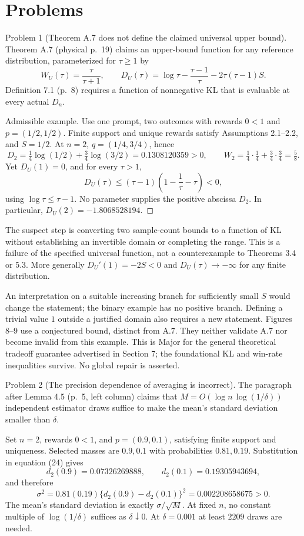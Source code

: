 \documentclass[10pt]{article}
\begin{document}
\section*{Problems}
Problem 1 (Theorem A.7 does not define the claimed universal upper bound).  Theorem A.7 (physical p. 19) claims an upper-bound function for any reference distribution, parameterized for \(\tau\ge1\) by \[W_U(\tau)=\frac{\tau}{\tau+1},\qquad
 D_U(\tau)=\log\tau-\frac{\tau-1}{\tau}-2\tau(\tau-1)S.\] Definition 7.1 (p. 8) requires a function of nonnegative KL that is evaluable at every actual \(D_n\).\par
Admissible example. Use one prompt, two outcomes with rewards \(0<1\) and \(p=(1/2,1/2)\). Finite support and unique rewards satisfy Assumptions 2.1–2.2, and \(S=1/2\). At \(n=2\), \(q=(1/4,3/4)\), hence \[D_2=\tfrac14\log(1/2)+\tfrac34\log(3/2)=0.1308120359>0,\qquad
 W_2=\tfrac14\cdot\tfrac14+\tfrac34\cdot\tfrac34=\tfrac58.\] Yet \(D_U(1)=0\), and for every \(\tau>1\), \[D_U(\tau)\le(\tau-1)\left(1-\frac1\tau-\tau\right)<0,\] using \(\log\tau\le\tau-1\). No parameter supplies the positive abscissa \(D_2\). In particular, \(D_U(2)=-1.8068528194\). ◻\par
The suspect step is converting two sample-count bounds to a function of KL without establishing an invertible domain or completing the range. This is a failure of the specified universal function, not a counterexample to Theorems 3.4 or 5.3. More generally \(D_U'(1)=-2S<0\) and \(D_U(\tau)\to-\infty\) for any finite distribution.\par
An interpretation on a suitable increasing branch for sufficiently small \(S\) would change the statement; the binary example has no positive branch. Defining a trivial value \(1\) outside a justified domain also requires a new statement. Figures 8–9 use a conjectured bound, distinct from A.7. They neither validate A.7 nor become invalid from this example. This is Major for the general theoretical tradeoff guarantee advertised in Section 7; the foundational KL and win-rate inequalities survive. No global repair is asserted.\par
Problem 2 (The precision dependence of averaging is incorrect).  The paragraph after Lemma 4.5 (p. 5, left column) claims that \(M=O(\log n\,\log(1/\delta))\) independent estimator draws suffice to make the mean’s standard deviation smaller than \(\delta\).\par
Set \(n=2\), rewards \(0<1\), and \(p=(0.9,0.1)\), satisfying finite support and uniqueness. Selected masses are \(0.9,0.1\) with probabilities \(0.81,0.19\). Substitution in equation (24) gives \[d_2(0.9)=0.07326269888,\qquad d_2(0.1)=0.19305943694,\] and therefore \[\sigma^2=0.81(0.19)\{d_2(0.9)-d_2(0.1)\}^2
 =0.002208658675>0.\] The mean’s standard deviation is exactly \(\sigma/\sqrt M\). At fixed \(n\), no constant multiple of \(\log(1/\delta)\) suffices as \(\delta\downarrow0\). At \(\delta=0.001\) at least \(2209\) draws are needed.\par
\end{document}
